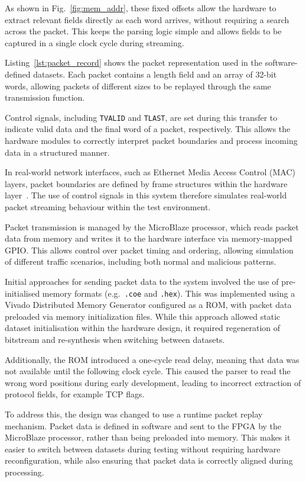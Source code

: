 As shown in Fig.~\ref{fig:mem_addr}, these fixed offsets allow
the hardware to extract relevant fields directly as each word arrives, without
requiring a search across the packet. This keeps the parsing logic simple and
allows fields to be captured in a single clock cycle during streaming.

Listing~\ref{lst:packet_record} shows the packet representation used in the
software-defined datasets. Each packet contains a length field and an array of
32-bit words, allowing packets of different sizes to be replayed through the
same transmission function.

Control signals, including \texttt{TVALID} and \texttt{TLAST}, are set during this transfer to indicate valid data and the final word of a packet, respectively. This allows the hardware modules to correctly interpret packet
boundaries and process incoming data in a structured manner.

In real-world network interfaces, such as Ethernet Media Access Control (MAC)
layers, packet boundaries are defined by frame structures within the hardware
layer~\cite{noauthor_ieee_2022}. The use of control signals in this system
therefore simulates real-world packet streaming behaviour within the
test environment.

Packet transmission is managed by the MicroBlaze processor, which reads packet
data from memory and writes it to the hardware interface via memory-mapped
GPIO. This allows control over packet timing and ordering, allowing simulation
of different traffic scenarios, including both normal and malicious patterns.

Initial approaches for sending packet data to the system involved the use of
pre-initialised memory formats (e.g.\texttt{ .coe} and \texttt{.hex}). This was
implemented using a Vivado Distributed Memory Generator configured as a ROM,
with packet data preloaded via memory initialization files. While this approach
allowed static dataset initialisation within the hardware design, it required
regeneration of bitstream and re-synthesis when switching between datasets.

Additionally, the ROM introduced a one-cycle read delay, meaning that data was
not available until the following clock cycle. This caused the parser to read
the wrong word positions during early development, leading to incorrect
extraction of protocol fields, for example TCP flags.

To address this, the design was changed to use a runtime packet replay
mechanism. Packet data is defined in software and sent to the FPGA by the
MicroBlaze processor, rather than being preloaded into memory. This makes it
easier to switch between datasets during testing without requiring hardware
reconfiguration, while also ensuring that packet data is correctly aligned
during processing.

